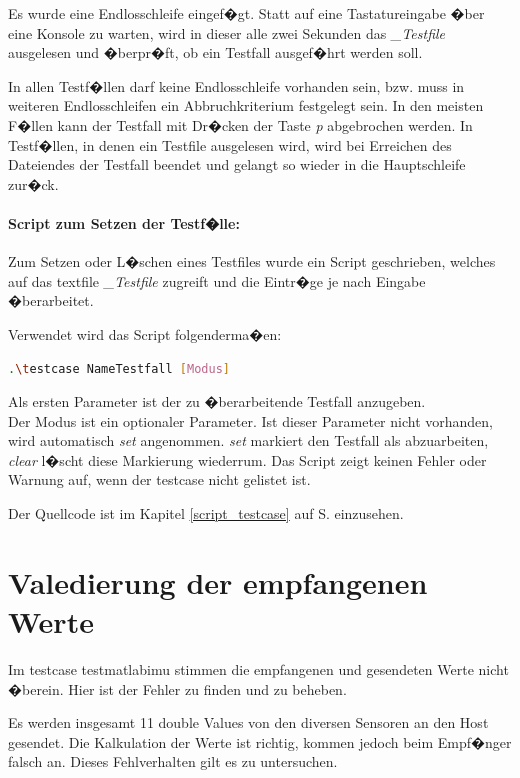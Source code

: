 Es wurde eine Endlosschleife eingef�gt. Statt auf eine Tastatureingabe �ber eine Konsole zu warten, wird in dieser alle zwei Sekunden das \textit{\_Testfile} ausgelesen und �berpr�ft, ob ein Testfall ausgef�hrt werden soll.


In allen Testf�llen darf keine Endlosschleife vorhanden sein, bzw. muss in weiteren Endlosschleifen ein Abbruchkriterium festgelegt sein. In den meisten F�llen kann der Testfall mit Dr�cken der Taste \textit{p} abgebrochen werden. In Testf�llen, in denen ein Testfile ausgelesen wird, wird bei Erreichen des Dateiendes der Testfall beendet und gelangt so wieder in die Hauptschleife zur�ck.

\paragraph{Script zum Setzen der Testf�lle:}

Zum Setzen oder L�schen eines Testfiles wurde ein Script geschrieben, welches auf das textfile \textit{\_Testfile} zugreift und die Eintr�ge je nach Eingabe �berarbeitet.

Verwendet wird das Script folgenderma�en:

\begin{lstlisting}[language=bash]
.\testcase NameTestfall [Modus]
\end{lstlisting}
 	 
Als ersten Parameter ist der zu �berarbeitende Testfall anzugeben.\\
Der Modus ist ein optionaler Parameter. Ist dieser Parameter nicht vorhanden, wird automatisch \emph{set} angenommen. \textit{set} markiert den Testfall als abzuarbeiten, \textit{clear} l�scht diese Markierung wiederrum. Das Script zeigt keinen Fehler oder Warnung auf, wenn der testcase nicht gelistet ist.

Der Quellcode ist im Kapitel \ref{script_testcase}  auf S.\pageref{script_testcase} einzusehen.

\newpage
\section{Valedierung der empfangenen Werte}
\label{sec:real-unter}
Im testcase testmatlabimu stimmen die empfangenen und gesendeten Werte nicht �berein. Hier ist der Fehler zu finden und zu beheben.

Es werden insgesamt 11 double Values von den diversen Sensoren an den Host gesendet. Die Kalkulation der Werte ist richtig, kommen jedoch beim Empf�nger falsch an. Dieses Fehlverhalten gilt es zu untersuchen.

